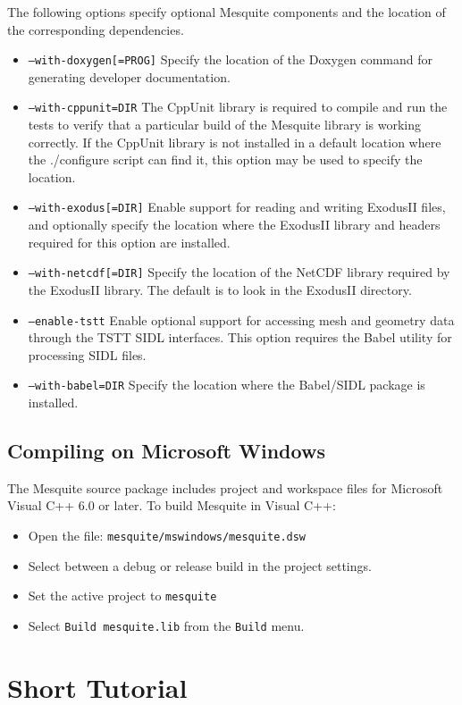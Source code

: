 \documentclass[letter]{report}
\begin{document}
The following options specify optional Mesquite components and the location 
of the corresponding dependencies.
\begin{itemize}
\item \texttt{--with-doxygen[=PROG]} Specify the location of the Doxygen
command for generating developer documentation.
\item \texttt{--with-cppunit=DIR}  The CppUnit library is required to compile
and run the tests to verify that a particular build of the Mesquite library
is working correctly.  If the CppUnit library is not installed in a default location
where the ./configure script can find it, this option may be used to specify
the location.
\item \texttt{--with-exodus[=DIR]}  Enable support for reading and writing
ExodusII files, and optionally specify the location where the ExodusII library
and headers required for this option are installed.
\item \texttt{--with-netcdf[=DIR]}  Specify the location of the NetCDF library
required by the ExodusII library.  The default is to look in the ExodusII
directory.
\item \texttt{--enable-tstt}  Enable optional support for accessing mesh
and geometry data through the TSTT SIDL interfaces.  This option requires
the Babel utility for processing SIDL files.
\item \texttt{--with-babel=DIR}  Specify the location where the Babel/SIDL
package is installed.
\end{itemize}

\subsection{Compiling on Microsoft Windows}
The Mesquite source package includes project and workspace files for Microsoft Visual C++ 6.0 or later.  To build Mesquite in Visual C++:
\begin{itemize}
\item Open the file: \texttt{mesquite/mswindows/mesquite.dsw}
\item Select between a debug or release build in the project settings.  
\item Set the active project to \texttt{mesquite}
\item Select \texttt{Build mesquite.lib} from the \texttt{Build} menu.
\end{itemize}

\section{Short Tutorial}
\end{document}
